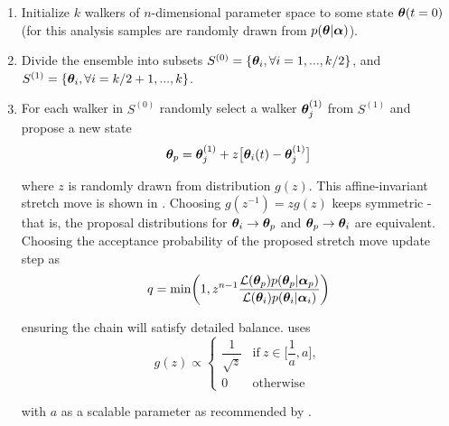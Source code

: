 \begin{enumerate}
\item Initialize $k$ walkers of $n$-dimensional parameter space to some state $\boldsymbol{\theta}(t = 0)$ (for this analysis samples are
randomly drawn from $p(\boldsymbol{\theta}|\boldsymbol{\alpha})$).

\item \label{itm:divide} Divide the ensemble into subsets $S^{(0)} = \{\boldsymbol{\theta}_i, \forall i = 1, . . ., k/2\}$, and
$S^{(1)} = \{\boldsymbol{\theta}_i, \forall i = k/2 + 1, . . ., k\}$.

\item \label{itm:newstate} For each walker in $S^{(0)}$ randomly select a walker $\boldsymbol{\theta}_j^{(1)}$ from $S^{(1)}$ and propose a new
state
\begin{equation}
\boldsymbol{\theta}_p = \boldsymbol{\theta}_j^{(1)} + z \big[ \boldsymbol{\theta}_i(t) - \boldsymbol{\theta}_j^{(1)} \big]
\label{eq:er_nr_calibrations_parameter_determ_mcmc_walker_update}
\end{equation}

\noindent where $z$ is randomly drawn from distribution $g(z)$. This affine-invariant stretch move is shown in
.  Choosing
$g(z^{-1}) = z g(z)$ keeps  symmetric - that is, the proposal
distributions for $\boldsymbol{\theta}_i \rightarrow \boldsymbol{\theta}_p$ and $\boldsymbol{\theta}_p \rightarrow \boldsymbol{\theta}_i$ are
equivalent.  Choosing the
acceptance probability of the proposed stretch move update step as
\begin{equation}
q = \mathrm{min} \bigg( 1, z^{n - 1} \frac{\mathcal{L}(\boldsymbol{\theta}_p)p(\boldsymbol{\theta}_p|\boldsymbol{\alpha}_p)}
{\mathcal{L}(\boldsymbol{\theta}_i)p(\boldsymbol{\theta}_i|\boldsymbol{\alpha}_i)} \bigg)
\label{eq:er_nr_calibrations_parameter_determ_mcmc_prob}
\end{equation}

\noindent ensuring the chain will satisfy detailed balance.   uses
\begin{equation}
g(z) \propto
\begin{cases}
\dfrac{1}{\sqrt{z}} & \mathrm{if}\ z \in \bigg[ \dfrac{1}{a}, a \bigg], \\
0 & \mathrm{otherwise}
\end{cases}
\end{equation}

\noindent with $a$ as a scalable parameter as recommended by .


\end{enumerate}

